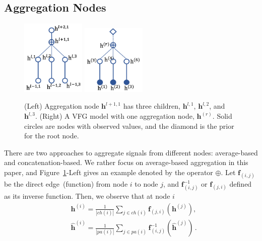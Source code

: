 \documentclass[twoside]{article}
\begin{document}
\subsection{ Aggregation Nodes}\label{sec:node_aggr}
\begin{figure}[H]
\begin{center}
 \includegraphics[width=1.2in]{fig/aggre_node.png}
  \includegraphics[width=1.2in]{fig/aggre_model.png}
\end{center}
   \caption{(Left) Aggregation node $\mathbf{h}^{l+1,1}$ has three children, $\mathbf{h}^{l,1}$, $\mathbf{h}^{l,2}$, and $\mathbf{h}^{l,3}$. (Right) A VFG model with one aggregation node, $\mathbf{h}^{(r)}$. Solid circles are nodes with observed values, and the diamond is the prior for the root node.}
\label{fig:node_aggre}
\end{figure}
\vspace{-0.05in}
 There are two approaches to aggregate signals from different nodes: average-based and concatenation-based. We rather focus on average-based aggregation in this paper,  and Figure~\ref{fig:node_aggre}-Left gives  an example denoted by the operator $\oplus$. 
Let $\mathbf{f}_{(i, j)}$ be the direct edge~(function) from node $i$ to node $j$, and $\mathbf{f}^{-1}_{ (i, j)}$ or  $\mathbf{f}_{ (j, i)}$ defined as its inverse function. Then, we observe that at node $i$
 \begin{align*}
&  \mathbf{h}^{(i)} = \frac{1}{|ch(i)|} \sum_{j \in ch(i) } \mathbf{f}_{(j,i)}(\mathbf{h}^{(j)})  , \\ &\widehat{\mathbf{h}}^{(i)} = \frac{1}{|pa(i)|} \sum_{j \in pa(i) } \mathbf{f}^{-1}_{ (i,j)}(\widehat{\mathbf{h}}^{(j)}) \, .
\end{align*}%
\end{document}
